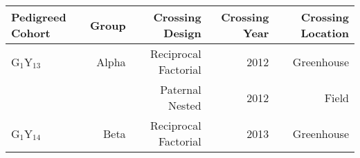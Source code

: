 \documentclass[10pt]{standalone} %
\begin{document}
\begin{tabular}{l r r r r } %
\toprule  %
 Pedigreed Cohort	& Group		& Crossing Design	& Crossing Year	& Crossing Location \\[5pt]
 \midrule
G$_1$Y$_{13}$		& Alpha		& Reciprocal Factorial	& 2012		& Greenhouse		\\[5pt]
 					&			& Paternal Nested		& 2012		& Field				\\[5pt]
G$_1$Y$_{14}$		& Beta		& Reciprocal Factorial	& 2013		& Greenhouse		\\[5pt]			  
\bottomrule

\end{tabular}
\end{document}
